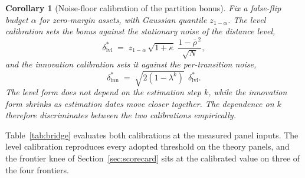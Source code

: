 \documentclass{rQUF2e}
\theoremstyle{plain}
\newtheorem{corollary}{Corollary}
\theoremstyle{remark}
\begin{document}
\begin{corollary}[Noise-floor calibration of the partition bonus]
\label{cor:delta}
Fix a false-flip budget $\alpha$ for zero-margin assets, with Gaussian quantile
$z_{1-\alpha}$. The level calibration sets the bonus against the stationary
noise of the distance level,
\begin{equation}
\delta^{*}_{\mathrm{lvl}}
\;=\; z_{1-\alpha}\, \sqrt{1+\kappa}\; \frac{1-\bar{\rho}^{\,2}}{\sqrt{N}},
\label{eq:deltalevel}
\end{equation}
and the innovation calibration sets it against the per-transition noise,
\begin{equation}
\delta^{*}_{\mathrm{inn}}
\;=\; \sqrt{2\left(1-\lambda^{k}\right)}\;\, \delta^{*}_{\mathrm{lvl}}.
\label{eq:deltainnovation}
\end{equation}
The level form does not depend on the estimation step $k$, while the
innovation form shrinks as estimation dates move closer together. The
dependence on $k$ therefore discriminates between the two calibrations
empirically.
\end{corollary}

Table~\ref{tab:bridge} evaluates both calibrations at the measured panel
inputs. The level calibration reproduces every adopted threshold on the theory
panels, and the frontier knee of Section~\ref{sec:scorecard} sits at the
calibrated value on three of the four frontiers.
\end{document}
